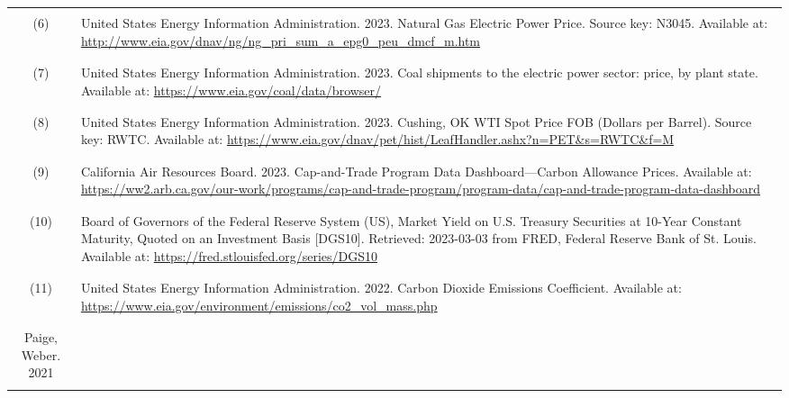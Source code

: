 \begin{center}
\begin{longtable}{c L{0.8\textwidth}}
        \hline \\[-3ex]
        (6) & United States Energy Information Administration. 2023. Natural Gas Electric Power Price. Source key: N3045. Available at: \url{http://www.eia.gov/dnav/ng/ng_pri_sum_a_epg0_peu_dmcf_m.htm} \\ \\[-3ex]
        \hline \\[-3ex]
        (7) & United States Energy Information Administration. 2023. Coal shipments to the electric power sector: price, by plant state. Available at: \url{https://www.eia.gov/coal/data/browser/} \\ \\[-3ex]
        \hline \\[-3ex]
        (8) & United States Energy Information Administration. 2023. Cushing, OK WTI Spot Price FOB (Dollars per Barrel). Source key: RWTC. Available at: \url{https://www.eia.gov/dnav/pet/hist/LeafHandler.ashx?n=PET&s=RWTC&f=M} \\ \\[-3ex]
        \hline \\[-3ex]
        (9) & California Air Resources Board. 2023. Cap-and-Trade Program Data Dashboard---Carbon Allowance Prices. Available at: \url{https://ww2.arb.ca.gov/our-work/programs/cap-and-trade-program/program-data/cap-and-trade-program-data-dashboard} \\ \\[-3ex]
        \hline \\[-3ex]
        (10) & Board of Governors of the Federal Reserve System (US), Market Yield on U.S. Treasury Securities at 10-Year Constant Maturity, Quoted on an Investment Basis [DGS10]. Retrieved: 2023-03-03 from FRED, Federal Reserve Bank of St. Louis. Available at: \url{https://fred.stlouisfed.org/series/DGS10} \\ \\[-3ex]
        \hline \\[-3ex]
        (11) & United States Energy Information Administration. 2022. Carbon Dioxide Emissions Coefficient. Available at: \url{https://www.eia.gov/environment/emissions/co2_vol_mass.php}\\ \\[-3ex]
        \hline \\[-3ex]
        Paige, Weber. 2021
        \\ \\[-3ex]
        \hline\hline
    \end{longtable}
\end{center}

